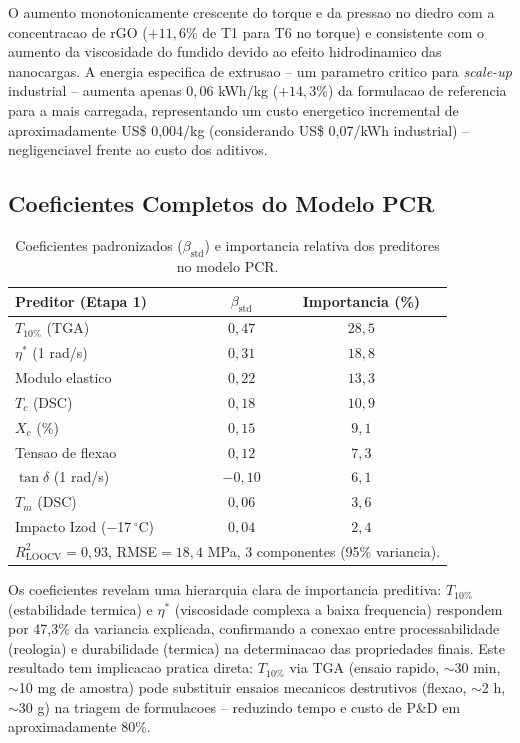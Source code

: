 \documentclass[11pt,a4paper,oneside]{article}
\begin{document}
O aumento monotonicamente crescente do torque e da pressao no diedro com a concentracao de rGO ($+11{,}6\%$ de T1 para T6 no torque) e consistente com o aumento da viscosidade do fundido devido ao efeito hidrodinamico das nanocargas. A energia especifica de extrusao -- um parametro critico para \textit{scale-up} industrial -- aumenta apenas $0{,}06$ kWh/kg ($+14{,}3\%$) da formulacao de referencia para a mais carregada, representando um custo energetico incremental de aproximadamente US\$ 0,004/kg (considerando US\$ 0,07/kWh industrial) -- negligenciavel frente ao custo dos aditivos.

\subsection{Coeficientes Completos do Modelo PCR}

\begin{table}[H]\centering
\caption{Coeficientes padronizados ($\beta_{\text{std}}$) e importancia relativa dos preditores no modelo PCR.}\label{tab:sup3}
\begin{tabular}{lcc}
\toprule
{\bfseries Preditor (Etapa 1)} & {\bfseries $\beta_{\text{std}}$} & {\bfseries Importancia (\%)} \\
\midrule
$T_{10\%}$ (TGA)               & $0{,}47$ & $28{,}5$ \\
$\eta^*$ (1 rad/s)             & $0{,}31$ & $18{,}8$ \\
Modulo elastico                & $0{,}22$ & $13{,}3$ \\
$T_c$ (DSC)                    & $0{,}18$ & $10{,}9$ \\
$X_c$ (\%)                     & $0{,}15$ & $9{,}1$ \\
Tensao de flexao               & $0{,}12$ & $7{,}3$ \\
$\tan\delta$ (1 rad/s)         & $-0{,}10$ & $6{,}1$ \\
$T_m$ (DSC)                    & $0{,}06$ & $3{,}6$ \\
Impacto Izod ($-$17$\,^{\circ}$C) & $0{,}04$ & $2{,}4$ \\
\bottomrule
\multicolumn{3}{l}{\footnotesize $R^2_{\text{LOOCV}}{=}0{,}93$, RMSE${=}18{,}4$ MPa, 3 componentes (95\% variancia).}\\
\end{tabular}
\end{table}

Os coeficientes revelam uma hierarquia clara de importancia preditiva: $T_{10\%}$ (estabilidade termica) e $\eta^*$ (viscosidade complexa a baixa frequencia) respondem por 47,3\% da variancia explicada, confirmando a conexao entre processabilidade (reologia) e durabilidade (termica) na determinacao das propriedades finais. Este resultado tem implicacao pratica direta: $T_{10\%}$ via TGA (ensaio rapido, ${\sim}$30 min, ${\sim}$10 mg de amostra) pode substituir ensaios mecanicos destrutivos (flexao, ${\sim}$2 h, ${\sim}$30 g) na triagem de formulacoes -- reduzindo tempo e custo de P\&D em aproximadamente 80\%.
\end{document}
